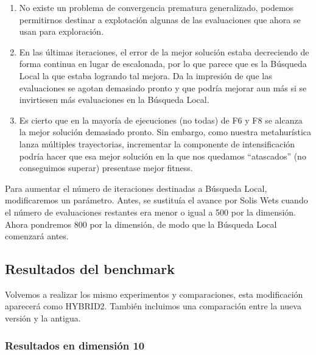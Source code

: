 \documentclass{article}
\begin{document}
\begin{enumerate}
	\item No existe un problema de convergencia prematura generalizado, podemos permitirnos destinar a explotación algunas de las evaluaciones
	 que ahora se usan para exploración.
	\item En las últimas iteraciones, el error de la mejor solución estaba decreciendo de forma continua en lugar de escalonada, por lo que
	 parece que es la Búsqueda Local la que estaba logrando tal mejora. Da la impresión de que las evaluaciones se agotan demasiado pronto y
	 que podría mejorar aun más si se invirtiesen más evaluaciones en la Búsqueda Local.
	\item Es cierto que en la mayoría de ejecuciones (no todas) de F6 y F8 se alcanza la mejor solución demasiado pronto. Sin embargo, como
	nuestra metahurística lanza múltiples trayectorias, incrementar la componente de intensificación podría hacer que esa mejor solución en la
	 que nos quedamos ``atascados'' (no conseguimos superar) presentase mejor fitness.
\end{enumerate}

Para aumentar el número de iteraciones destinadas a Búsqueda Local, modificaremos un parámetro. Antes, se sustituía el avance por Solis Wets cuando
el número de evaluaciones restantes era menor o igual a 500 por la dimensión. Ahora pondremos 800 por la dimensión, de modo que la Búsqueda
Local comenzará antes.

\subsection{Resultados del benchmark}

Volvemos a realizar los mismo experimentos y comparaciones, esta modificación aparecerá como HYBRID2. También incluimos una comparación
entre la nueva versión y la antigua.

\subsubsection*{Resultados en dimensión 10}
\end{document}
